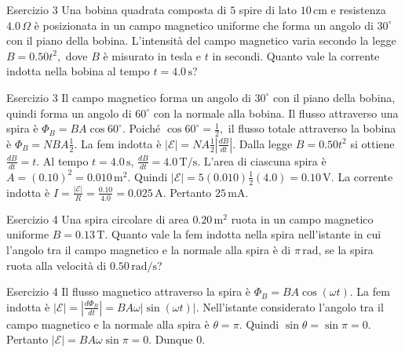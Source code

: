 \documentclass[a4paper]{article}
\begin{document}
\begin{snippetexercise}{Esercizio 3}
    Una bobina quadrata composta di \(5\) spire di lato \(10\,\mathrm{cm}\) e
    resistenza \(4.0\,\Omega\) è posizionata in un campo magnetico uniforme che
    forma un angolo di \(30^\circ\) con il piano della bobina. L'intensità del
    campo magnetico varia secondo la legge
    \(B = 0.50t^2,\)
    dove \(B\) è misurato in tesla e \(t\) in secondi. Quanto vale la corrente
    indotta nella bobina al tempo \(t = 4.0\,\mathrm{s}\)?

\end{snippetexercise}
\begin{snippetsolution}{Esercizio 3}
    Il campo magnetico forma un angolo di \(30^\circ\) con il piano della
    bobina, quindi forma un angolo di \(60^\circ\) con la normale alla bobina.
    Il flusso attraverso una spira è
    \(\Phi_B = BA\cos 60^\circ.\)
    Poiché
    \(\cos 60^\circ = \frac{1}{2},\)
    il flusso totale attraverso la bobina è
    \(\Phi_B = NBA\frac{1}{2}.\)
    La fem indotta è
    \(|\mathcal{E}| = N A \frac{1}{2}\left|\frac{dB}{dt}\right|.\)
    Dalla legge
    \(B = 0.50t^2\)
    si ottiene
    \(\frac{dB}{dt} = t.\)
    Al tempo \(t = 4.0\,\mathrm{s}\),
    \(\frac{dB}{dt}=4.0\,\mathrm{T/s}.\)
    L'area di ciascuna spira è
    \(A = (0.10)^2 = 0.010\,\mathrm{m^2}.\)
    Quindi
    \(|\mathcal{E}| = 5(0.010)\frac{1}{2}(4.0) = 0.10\,\mathrm{V}.\)
    La corrente indotta è
    \(I = \frac{|\mathcal{E}|}{R} = \frac{0.10}{4.0} = 0.025\,\mathrm{A}.\)
    Pertanto
    \(\boxed{25\,\mathrm{mA}}.\)
\end{snippetsolution}
\begin{snippetexercise}{Esercizio 4}
    Una spira circolare di area \(0.20\,\mathrm{m^2}\) ruota in un campo
    magnetico uniforme \(B = 0.13\,\mathrm{T}\). Quanto vale la fem indotta
    nella spira nell'istante in cui l'angolo tra il campo magnetico e la normale
    alla spira è di \(\pi\,\mathrm{rad}\), se la spira ruota alla velocità di
    \(0.50\,\mathrm{rad/s}\)?

\end{snippetexercise}
\begin{snippetsolution}{Esercizio 4}
    Il flusso magnetico attraverso la spira è
    \(\Phi_B = BA\cos(\omega t).\)
    La fem indotta è
    \(|\mathcal{E}| = \left|\frac{d\Phi_B}{dt}\right| = BA\omega|\sin(\omega t)|.\)
    Nell'istante considerato l'angolo tra il campo magnetico e la normale alla
    spira è
    \(\theta = \pi.\)
    Quindi
    \(\sin\theta = \sin\pi = 0.\)
    Pertanto
    \(|\mathcal{E}| = BA\omega \sin\pi = 0.\)
    Dunque
    \(\boxed{0}.\)
\end{snippetsolution}
\end{document}
